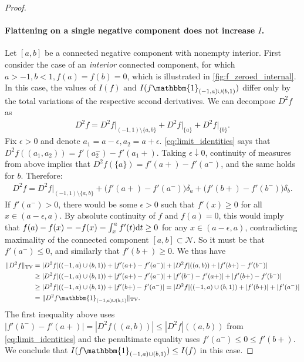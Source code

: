 \documentclass{article}
\newcommand{\dt}{\textnormal{d}t}
\DeclareMathOperator{\TV}{TV}
\def\cN{{\mathcal{N}}}
\begin{document}
\begin{appendices}
\begin{proof}
    
    \paragraph{Flattening on a single negative component does not increase $I$.} Let $[a,b]$ be a connected negative component with nonempty interior. First consider the case of an \textit{interior} connected component, for which $a > -1, b < 1, f(a) = f(b) = 0$, which is illustrated in \cref{fig:f_zeroed_internal}. In this case, the values of $I(f)$ and $I(f \mathbbm{1}_{(-1,a) \cup (b,1)})$ differ only by the total variations of the respective second derivatives. We can decompose $D^2 f$ as
    \begin{align}
        D^2 f = D^2 f \rvert_{(-1,1) \setminus \{a,b\}} + D^2 f \rvert_{\{a\}} + D^2 f \rvert_{\{b\}}.
    \end{align}
    Fix $\epsilon > 0$ and denote $a_1 = a- \epsilon, a_2 = a + \epsilon$. \eqref{eq:limit_identities} says that $D^2 f((a_1, a_2)) = f'(a_2^{-}) - f'(a_1+)$. Taking $\epsilon \downarrow 0$, continuity of measures from above implies that $D^2 f (\{ a \}) = f'(a+) - f'(a^{-})$, and the same holds for $b$. Therefore:
    \begin{align}
        D^2 f = D^2 f \rvert_{(-1,1) \setminus \{a,b \}} + \big(f'(a+) - f'(a^{-}) \big) \delta_a +  \big(f'(b+) - f'(b^{-}) \big) \delta_b. 
    \end{align}
    If $f'(a^{-}) > 0$, there would be some $\epsilon > 0$ such that $f'(x) \geq 0$ for all $x \in (a-\epsilon, a)$. By absolute continuity of $f$ and $f(a) = 0$, this would imply that $f(a) - f(x) = - f(x) = \int_x^a f'(t) \dt \geq 0$ for any $x \in (a-\epsilon, a)$, contradicting maximality of the connected component $[a,b] \subset \cN$. So it must be that $f'(a^{-}) \leq 0$, and similarly that $f'(b+) \geq 0$. We thus have
    \begin{align}
        \| D^2 f \|_{\TV} &= |D^2 f|((-1,a) \cup (b,1)) + |f'(a+) - f'(a^{-})| + |D^2 f|((a,b)) + |f'(b+) - f'(b^{-})| \\
        &\geq |D^2 f|((-1,a) \cup (b,1)) + |f'(a+) - f'(a^{-})| + |f'(b^{-}) - f'(a+) | + |f'(b+) - f'(b^{-})| \\
        &\geq |D^2 f|((-1,a) \cup (b,1)) + |f'(b+) - f'(a^{-})| = |D^2 f|((-1,a) \cup (b,1)) + |f'(b+)| + |f'(a^{-})| \\
        &= \| D^2 f \mathbbm{1}_{(-1,a) \cup (b,1)} \|_{\TV}.
    \end{align}
    The first inequality above uses $|f'(b^{-}) - f'(a+)| = |D^2 f((a,b))| \leq |D^2 f|((a,b))$ from \eqref{eq:limit_identities} and the penultimate equality uses $f'(a^{-}) \leq 0 \leq f'(b+)$. We conclude that $I(f \mathbbm{1}_{(-1,a) \cup (b,1)}) \leq I(f)$ in this case.


\end{proof}
\end{appendices}
\end{document}
